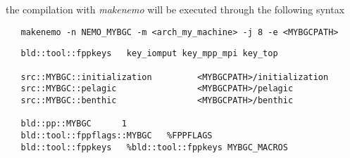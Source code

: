 \documentclass[../main/TOP_manual]{subfiles}
\begin{document}
the compilation with \textit{makenemo} will be executed through the following syntax

\begin{verbatim}
   makenemo -n NEMO_MYBGC -m <arch_my_machine> -j 8 -e <MYBGCPATH>
\end{verbatim}
%
%
%
%
%
\begin{verbatim}
   bld::tool::fppkeys   key_iomput key_mpp_mpi key_top

   src::MYBGC::initialization         <MYBGCPATH>/initialization
   src::MYBGC::pelagic                <MYBGCPATH>/pelagic
   src::MYBGC::benthic                <MYBGCPATH>/benthic

   bld::pp::MYBGC      1
   bld::tool::fppflags::MYBGC   %FPPFLAGS
   bld::tool::fppkeys   %bld::tool::fppkeys MYBGC_MACROS
\end{verbatim}

%
%
%
%
%
\end{document}
